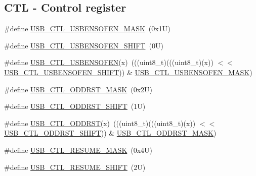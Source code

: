 \subsection*{C\+TL -\/ Control register}
\begin{DoxyCompactItemize}
\item 
\#define \mbox{\hyperlink{group___u_s_b___register___masks_gaa406be72ac0b31143d3a3bc357af334b}{U\+S\+B\+\_\+\+C\+T\+L\+\_\+\+U\+S\+B\+E\+N\+S\+O\+F\+E\+N\+\_\+\+M\+A\+SK}}~(0x1\+U)
\item 
\#define \mbox{\hyperlink{group___u_s_b___register___masks_ga674ca18da1675b8ae48c65ca4203da36}{U\+S\+B\+\_\+\+C\+T\+L\+\_\+\+U\+S\+B\+E\+N\+S\+O\+F\+E\+N\+\_\+\+S\+H\+I\+FT}}~(0\+U)
\item 
\#define \mbox{\hyperlink{group___u_s_b___register___masks_gafcc995142941dbf5985fdd3b4c21ca81}{U\+S\+B\+\_\+\+C\+T\+L\+\_\+\+U\+S\+B\+E\+N\+S\+O\+F\+EN}}(x)~(((uint8\+\_\+t)(((uint8\+\_\+t)(x)) $<$$<$ \mbox{\hyperlink{group___u_s_b___register___masks_ga674ca18da1675b8ae48c65ca4203da36}{U\+S\+B\+\_\+\+C\+T\+L\+\_\+\+U\+S\+B\+E\+N\+S\+O\+F\+E\+N\+\_\+\+S\+H\+I\+FT}})) \& \mbox{\hyperlink{group___u_s_b___register___masks_gaa406be72ac0b31143d3a3bc357af334b}{U\+S\+B\+\_\+\+C\+T\+L\+\_\+\+U\+S\+B\+E\+N\+S\+O\+F\+E\+N\+\_\+\+M\+A\+SK}})
\item 
\#define \mbox{\hyperlink{group___u_s_b___register___masks_ga70907cc5c00bad68669ef02ec1332bfc}{U\+S\+B\+\_\+\+C\+T\+L\+\_\+\+O\+D\+D\+R\+S\+T\+\_\+\+M\+A\+SK}}~(0x2\+U)
\item 
\#define \mbox{\hyperlink{group___u_s_b___register___masks_ga6e2ea6a3166748c567d22a767c69f98d}{U\+S\+B\+\_\+\+C\+T\+L\+\_\+\+O\+D\+D\+R\+S\+T\+\_\+\+S\+H\+I\+FT}}~(1\+U)
\item 
\#define \mbox{\hyperlink{group___u_s_b___register___masks_ga108f100f640bfdf7ca2f4b2cd371126a}{U\+S\+B\+\_\+\+C\+T\+L\+\_\+\+O\+D\+D\+R\+ST}}(x)~(((uint8\+\_\+t)(((uint8\+\_\+t)(x)) $<$$<$ \mbox{\hyperlink{group___u_s_b___register___masks_ga6e2ea6a3166748c567d22a767c69f98d}{U\+S\+B\+\_\+\+C\+T\+L\+\_\+\+O\+D\+D\+R\+S\+T\+\_\+\+S\+H\+I\+FT}})) \& \mbox{\hyperlink{group___u_s_b___register___masks_ga70907cc5c00bad68669ef02ec1332bfc}{U\+S\+B\+\_\+\+C\+T\+L\+\_\+\+O\+D\+D\+R\+S\+T\+\_\+\+M\+A\+SK}})
\item 
\#define \mbox{\hyperlink{group___u_s_b___register___masks_ga4e385fa5cf2157ef30a39c1c2b766cd3}{U\+S\+B\+\_\+\+C\+T\+L\+\_\+\+R\+E\+S\+U\+M\+E\+\_\+\+M\+A\+SK}}~(0x4\+U)
\item 
\#define \mbox{\hyperlink{group___u_s_b___register___masks_gab8354dafb3b0cb438770fe60ffec4714}{U\+S\+B\+\_\+\+C\+T\+L\+\_\+\+R\+E\+S\+U\+M\+E\+\_\+\+S\+H\+I\+FT}}~(2\+U)

\end{DoxyCompactItemize}
